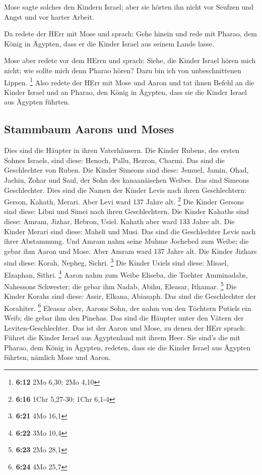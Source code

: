  Mose sagte solches den Kindern Israel; aber sie hörten
ihn nicht vor Seufzen und Angst und vor harter Arbeit.

 Da redete der HErr mit Mose und sprach: 
Gehe hinein und rede mit Pharao, dem König in Ägypten, dass er die
Kinder Israel aus seinem Lande lasse.

 Mose aber redete vor dem HErrn und sprach: Siehe, die
Kinder Israel hören mich nicht; wie sollte mich denn Pharao hören? Dazu
bin ich von unbeschnittenen Lippen. \footnote{\textbf{6:12} 2Mo 6,30;
  2Mo 4,10}  Also redete der HErr mit Mose und Aaron und
tat ihnen Befehl an die Kinder Israel und an Pharao, den König in
Ägypten, dass sie die Kinder Israel aus Ägypten führten.

\hypertarget{stammbaum-aarons-und-moses}{%
\subsection{Stammbaum Aarons und
Moses}\label{stammbaum-aarons-und-moses}}

 Dies sind die Häupter in ihren Vaterhäusern. Die Kinder
Rubens, des ersten Sohnes Israels, sind diese: Henoch, Pallu, Hezron,
Charmi. Das sind die Geschlechter von Ruben.  Die Kinder
Simeons sind diese: Jemuel, Jamin, Ohad, Jachin, Zohar und Saul, der
Sohn des kanaanäischen Weibes. Das sind Simeons Geschlechter.
 Dies sind die Namen der Kinder Levis nach ihren
Geschlechtern: Gerson, Kahath, Merari. Aber Levi ward 137 Jahre alt.
\footnote{\textbf{6:16} 1Chr 5,27-30; 1Chr 6,1-4}  Die
Kinder Gersons sind diese: Libni und Simei nach ihren Geschlechtern.
 Die Kinder Kahaths sind diese: Amram, Jizhar, Hebron,
Usiel. Kahath aber ward 133 Jahre alt.  Die Kinder Merari
sind diese: Maheli und Musi. Das sind die Geschlechter Levis nach ihrer
Abstammung.  Und Amram nahm seine Muhme Jochebed zum
Weibe; die gebar ihm Aaron und Mose. Aber Amram ward 137 Jahre alt.
 Die Kinder Jizhars sind diese: Korah, Nepheg, Sichri.
\footnote{\textbf{6:21} 4Mo 16,1}  Die Kinder Usiels sind
diese: Misael, Elzaphan, Sithri. \footnote{\textbf{6:22} 3Mo 10,4}
 Aaron nahm zum Weibe Eliseba, die Tochter Amminadabs,
Nahessons Schwester; die gebar ihm Nadab, Abihu, Eleasar, Ithamar.
\footnote{\textbf{6:23} 2Mo 28,1}  Die Kinder Korahs sind
diese: Assir, Elkana, Abiasaph. Das sind die Geschlechter der Korahiter.
\footnote{\textbf{6:24} 4Mo 25,7}  Eleasar aber, Aarons
Sohn, der nahm von den Töchtern Putiels ein Weib; die gebar ihm den
Pinehas. Das sind die Häupter unter den Vätern der Leviten-Geschlechter.
 Das ist der Aaron und Mose, zu denen der HErr sprach:
Führet die Kinder Israel aus Ägyptenland mit ihrem Heer. 
Sie sind's die mit Pharao, dem König in Ägypten, redeten, dass sie die
Kinder Israel aus Ägypten führten, nämlich Mose und Aaron.

